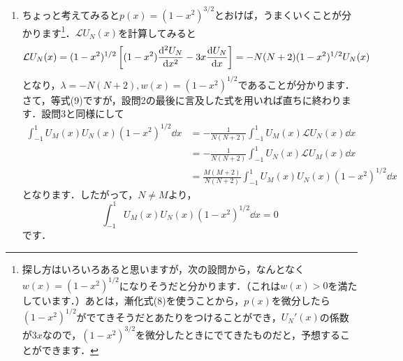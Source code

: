 \documentclass[a4paper,pdflatex,ja=standard]{bxjsarticle}
\begin{document}
\begin{enumerate}
  \item 

  ちょっと考えてみると$p(x)=(1-x^2)^{3/2}$とおけば，うまくいくことが分かります\footnote{
    探し方はいろいろあると思いますが，次の設問から，なんとなく$w(x)=(1-x^2)^{1/2}$になりそうだと分かります．（これは$w(x)>0$を満たしています．）あとは，漸化式(8)を使うことから，$p(x)$を微分したら$(1-x^2)^{1/2}$がでてきそうだとあたりをつけることができ，$U_N'(x)$の係数が$3x$なので，$(1-x^2)^{3/2}$を微分したときにでてきたものだと，予想することができます．
  }．$\mathcal{L}U_N(x)$を計算してみると
  \begin{equation}
    \mathcal{L}U_N(x)
    =
    (1-x^2)^{1/2}\left[  
      (1-x^2)\dv[2]{U_N}{x}-3x\dv{U_N}{x}
    \right]
    =
    -N(N+2)(1-x^2)^{1/2}U_N(x)
  \end{equation}
  となり，$\lambda=-N(N+2), w(x)=(1-x^2)^{1/2}$であることが分かります．さて，等式(9)ですが，設問2の最後に言及した式を用いれば直ちに終わります．設問3と同様にして
  \begin{align}
    \int_{-1}^{1}
    U_M(x)U_N(x)(1-x^2)^{1/2}
    \dd x
    &=
    -\frac{1}{N(N+2)}    
    \int_{-1}^{1}
    U_M(x)\mathcal{L}U_N(x)
    \dd x
    \nonumber
    \\
    &=
    -\frac{1}{N(N+2)}    
    \int_{-1}^{1}
    U_N(x)\mathcal{L}U_M(x)
    \dd x
    \nonumber
    \\
    &=
    \frac{M(M+2)}{N(N+2)}
    \int_{-1}^{1}
    U_M(x)U_N(x)(1-x^2)^{1/2}
    \dd x
  \end{align}
  となります．したがって，$N\neq M$より，
  \begin{equation}
    \int_{-1}^{1}
    U_M(x)U_N(x)(1-x^2)^{1/2}
    \dd x
    =
    0
  \end{equation}
  です．

\end{enumerate}
\end{document}
